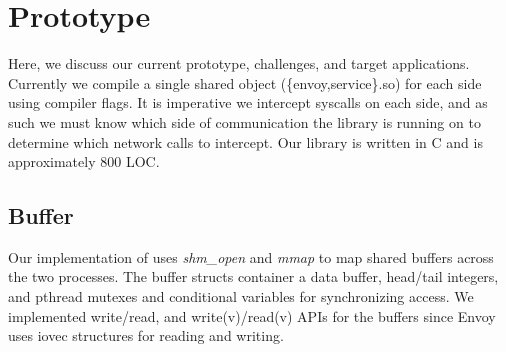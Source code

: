 \section{Prototype}
\label{sec:prototype}
Here, we discuss our current prototype, challenges, and target applications.
Currently we compile a single shared object (\{envoy,service\}.so) for each side using compiler flags.
It is imperative we intercept syscalls on each side, and as such we must know which side of communication the library is running on to determine which network calls to intercept.
Our library is written in C and is approximately 800 LOC.

\subsection{\sysname Buffer}
Our implementation of \sysname uses \textit{shm\_open} and \textit{mmap} to map shared buffers across the two processes.
The buffer structs container a data buffer, head/tail integers, and pthread mutexes and conditional variables for synchronizing access.
We implemented write/read, and write(v)/read(v) APIs for the buffers since Envoy uses iovec structures for reading and writing.


